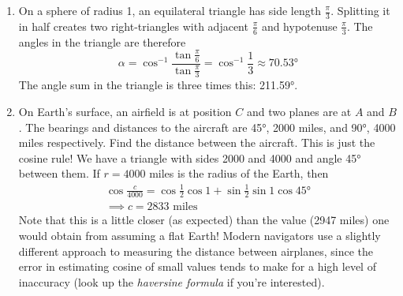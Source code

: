 \begin{enumerate}
	\item On a sphere of radius 1, an equilateral triangle has side length $\frac\pi 3$. Splitting it in half creates two right-triangles with adjacent $\frac\pi 6$ and hypotenuse $\frac\pi 3$. The angles in the triangle are therefore
	\[\alpha=\cos^{-1}\frac{\tan\frac\pi 6}{\tan\frac\pi 3}=\cos^{-1}\frac 13\approx \ang{70.53}\]
	The angle sum in the triangle is three times this: \ang{211.59}.
	
	\item On Earth's surface, an airfield is at position $C$ and two planes are at $A$ and $B$. The bearings and distances to the aircraft are \ang{45}, 2000 miles, and \ang{90}, 4000 miles respectively. Find the distance between the aircraft.\smallbreak
	This is just the cosine rule! We have a triangle with sides 2000 and 4000 and angle \ang{45} between them. If $r=4000$ miles is the radius of the Earth, then
	\begin{gather*}
	\cos\frac c{4000}=\cos\frac 1{2}\cos 1+\sin\frac 12\sin 1\cos\ang{45}\\
	\implies c=2833\text{ miles}
	\end{gather*}
	Note that this is a little closer (as expected) than the value (2947 miles) one would obtain from assuming a flat Earth!\smallbreak
	Modern navigators use a slightly different approach to measuring the distance between airplanes, since the error in estimating cosine of small values tends to make for a high level of inaccuracy (look up the \emph{haversine formula} if you're interested).
\end{enumerate}



